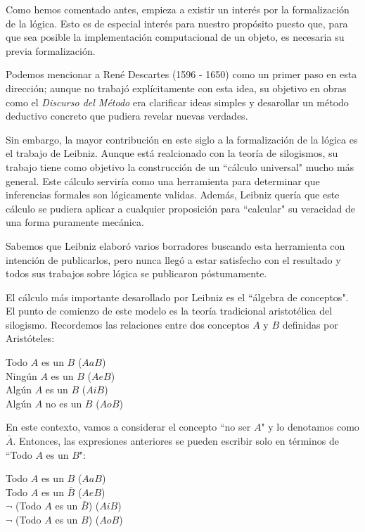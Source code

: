 \documentclass{article}
\begin{document}
Como hemos comentado antes, empieza a existir un interés por la formalización de la lógica. Esto es de especial interés para nuestro propósito puesto que, para que sea posible la implementación computacional de un objeto, es necesaria su previa formalización.

Podemos mencionar a René Descartes (1596 - 1650) como un primer paso en esta dirección; aunque no trabajó explícitamente con esta idea, su objetivo en obras como el \textit{Discurso del Método} era clarificar ideas simples y desarollar un método deductivo concreto que pudiera revelar nuevas verdades\cite{wahl2008port}.

Sin embargo, la mayor contribución en este siglo a la formalización de la lógica es el trabajo de Leibniz. Aunque está realcionado con la teoría de silogismos, su trabajo tiene como objetivo la construcción de un ``cálculo universal" mucho más general. Este cálculo serviría como una herramienta para determinar que inferencias formales son lógicamente validas. Además, Leibniz quería que este cálculo se pudiera aplicar a cualquier proposición para ``calcular" su veracidad de una forma puramente mecánica.

Sabemos que Leibniz elaboró varios borradores buscando esta herramienta con intención de publicarlos, pero nunca llegó a estar satisfecho con el resultado y todos sus trabajos sobre lógica se publicaron póstumamente.

El cálculo más importante desarollado por Leibniz es el ``álgebra de conceptos". El punto de comienzo de este modelo es la teoría tradicional aristotélica del silogismo. Recordemos las relaciones entre dos conceptos $A$ y $B$ definidas por Aristóteles:

\begin{displayquote}
    Todo $A$ es un $B$ ($AaB$)\\
    Ningún $A$ es un $B$ ($AeB$)\\
    Algún $A$ es un $B$ ($AiB$)\\
    Algún $A$ no es un $B$ ($AoB$)\\
\end{displayquote}

En este contexto, vamos a considerar el concepto ``no ser $A$" y lo denotamos como $\bar{A}$. Entonces, las expresiones anteriores se pueden escribir solo en términos de ``Todo $A$ es un $B$":

\begin{displayquote}
    Todo $A$ es un $B$ ($AaB$)\\
    Todo $A$ es un $\bar{B}$ ($AeB$)\\
    $\lnot$ (Todo $A$ es un $\bar{B}$) ($AiB$)\\
    $\lnot$ (Todo $A$ es un $B$) ($AoB$)\\
\end{displayquote}
\end{document}
